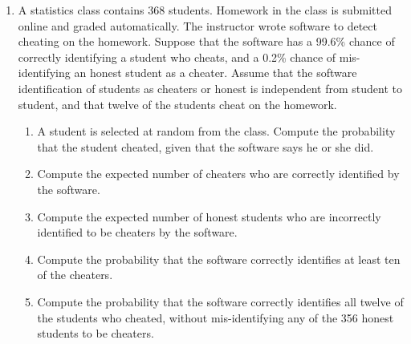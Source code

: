 \documentclass[12pt]{article}%
\newcommand{\0}{{\bf 0}}
\begin{document}
\begin{enumerate}

\item
A statistics class contains 368 students. Homework in the class is submitted online and graded automatically. The instructor wrote software to detect cheating on the homework. Suppose that the software has a 99.6\% chance of correctly identifying a student who cheats, and a 0.2\% chance of mis-identifying an honest student as a cheater. Assume that the software identification of students as cheaters or honest is independent from student to student, and that twelve of the students cheat on the homework.
\begin{enumerate}
\item A student is selected at random from the class. Compute the probability that the student cheated, given that the software says he or she did.
\item Compute the expected number of cheaters who are correctly identified by the software.
\item Compute the expected number of honest students who are incorrectly identified to be cheaters by the software.
\item Compute the probability that the software correctly identifies at least ten of the cheaters.
\item Compute the probability that the software correctly identifies all twelve of the students who cheated, without mis-identifying any of the 356 honest students to be cheaters.
\end{enumerate}


\end{enumerate}
\end{document}
